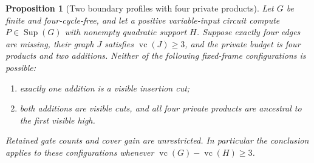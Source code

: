 \documentclass[11pt]{article}
\newcommand{\Sup}{\operatorname{Sup}}
\newcommand{\vc}{\operatorname{vc}}
\newtheorem{proposition}[theorem]{Proposition}
\theoremstyle{definition}
\theoremstyle{remark}
\begin{document}
\begin{proposition}[Two boundary profiles with four private products]
\label{prop:sevenfactorprofiles}
Let $G$ be finite and four-cycle-free, and let a positive variable-input
circuit compute $P\in\Sup(G)$ with nonempty quadratic support $H$.
Suppose exactly four edges are missing, their graph $J$ satisfies
$\vc(J)\ge3$, and the private budget is four products and two additions.
Neither of the following fixed-frame configurations is possible:
\begin{enumerate}
\item exactly one addition is a visible insertion cut;
\item both additions are visible cuts, and all four private products
are ancestral to the first visible high.
\end{enumerate}
Retained gate counts and cover gain are unrestricted. In particular the
conclusion applies to these configurations whenever
$\vc(G)-\vc(H)\ge3$.
\end{proposition}
\end{document}
